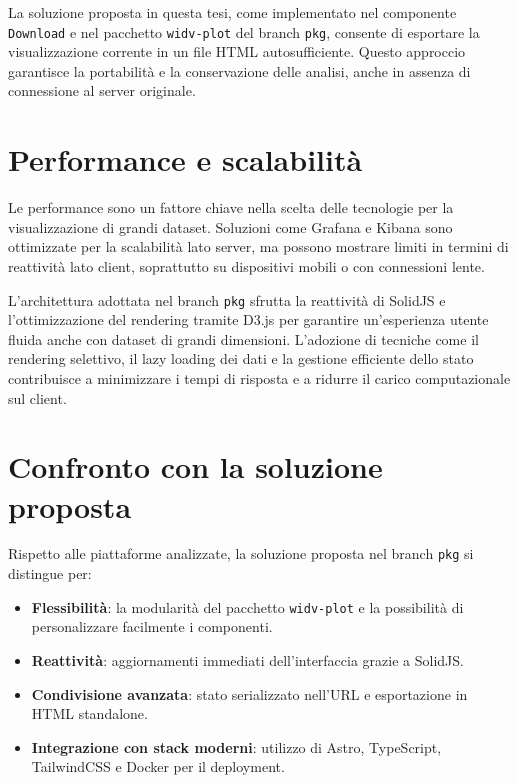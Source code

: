 La soluzione proposta in questa tesi, come implementato nel componente \texttt{Download} e nel pacchetto \texttt{widv-plot} del branch \texttt{pkg}, consente di esportare la visualizzazione corrente in un file HTML autosufficiente. Questo approccio garantisce la portabilità e la conservazione delle analisi, anche in assenza di connessione al server originale.

\section{Performance e scalabilità}

Le performance sono un fattore chiave nella scelta delle tecnologie per la visualizzazione di grandi dataset. Soluzioni come Grafana e Kibana sono ottimizzate per la scalabilità lato server, ma possono mostrare limiti in termini di reattività lato client, soprattutto su dispositivi mobili o con connessioni lente.

L'architettura adottata nel branch \texttt{pkg} sfrutta la reattività di SolidJS e l'ottimizzazione del rendering tramite D3.js per garantire un'esperienza utente fluida anche con dataset di grandi dimensioni. L'adozione di tecniche come il rendering selettivo, il lazy loading dei dati e la gestione efficiente dello stato contribuisce a minimizzare i tempi di risposta e a ridurre il carico computazionale sul client.

\section{Confronto con la soluzione proposta}

Rispetto alle piattaforme analizzate, la soluzione proposta nel branch \texttt{pkg} si distingue per:

\begin{itemize}
    \item \textbf{Flessibilità}: la modularità del pacchetto \texttt{widv-plot} e la possibilità di personalizzare facilmente i componenti.
    \item \textbf{Reattività}: aggiornamenti immediati dell'interfaccia grazie a SolidJS.
    \item \textbf{Condivisione avanzata}: stato serializzato nell'URL e esportazione in HTML standalone.
    \item \textbf{Integrazione con stack moderni}: utilizzo di Astro, TypeScript, TailwindCSS e Docker per il deployment.
\end{itemize}

